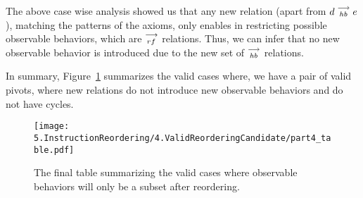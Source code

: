     The above case wise analysis showed us that any new relation (apart from $d\stackrel{\longrightarrow}{_{hb}}e$), matching the patterns of the axioms, only enables in restricting possible observable behaviors, which are $\stackrel{\longrightarrow}{_{rf}}$ relations. 
    Thus, we can infer that no new observable behavior is introduced due to the new set of $\stackrel{\longrightarrow}{_{hb}}$ relations. 
    
    In summary, Figure~\ref{reord:final_table} summarizes the valid cases where, we have a pair of valid pivots, where new relations do not introduce new observable behaviors and do not have cycles. 
    \begin{figure}[H]
        \centering
        \texttt{[image: 5.InstructionReordering/4.ValidReorderingCandidate/part4\_table.pdf]}
        \caption{The final table summarizing the valid cases where observable behaviors will only be a subset after reordering.}
        \label{reord:final_table}
    \end{figure}
